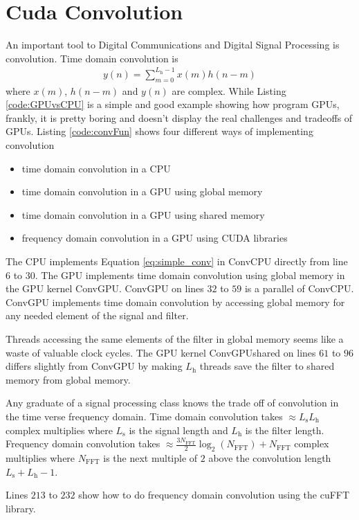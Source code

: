\section{Cuda Convolution}
An important tool to Digital Communications and Digital Signal Processing is convolution.
Time domain convolution is
\begin{align}
y(n) = \sum^{L_\text{h}-1}_{m=0} x(m) h(n-m)
	 \label{eq:simple_conv}
\end{align}
where $x(m)$, $h(n-m)$ and $y(n)$ are complex. 
While Listing \ref{code:GPUvsCPU} is a simple and good example showing how program GPUs, frankly, it is pretty boring and doesn't display the real challenges and tradeoffs of GPUs.
Listing \ref{code:convFun} shows four different ways of implementing convolution
\begin{itemize}
  \item time domain convolution in a CPU
  \item time domain convolution in a GPU using global memory
  \item time domain convolution in a GPU using shared memory
  \item frequency domain convolution in a GPU using CUDA libraries
\end{itemize}
The CPU implements Equation \eqref{eq:simple_conv} in ConvCPU directly from line $6$ to $30$.
The GPU implements time domain convolution using global memory in the GPU kernel ConvGPU.
ConvGPU on lines $32$ to $59$ is a parallel of ConvCPU.
ConvGPU implements time domain convolution by accessing global memory for any needed element of the signal and filter.

Threads accessing the same elements of the filter in global memory seems like a waste of valuable clock cycles.
The GPU kernel ConvGPUshared on lines $61$ to $96$ differs slightly from ConvGPU by making $L_\text{h}$ threads save the filter to shared memory from global memory.

Any graduate of a signal processing class knows the trade off of convolution in the time verse frequency domain.
Time domain convolution takes $\approx L_\text{s} L_\text{h}$ complex multiplies where $L_\text{s}$ is the signal length and $L_\text{h}$ is the filter length.
Frequency domain convolution takes $\approx \frac{3 N_\text{FFT}}{2} \log_2(N_\text{FFT}) + N_\text{FFT}$ complex multiplies where $N_\text{FFT}$ is the next multiple of $2$ above the convolution length $L_\text{s}+L_\text{h}-1$.

Lines $213$ to $232$ show how to do frequency domain convolution using the cuFFT library.

